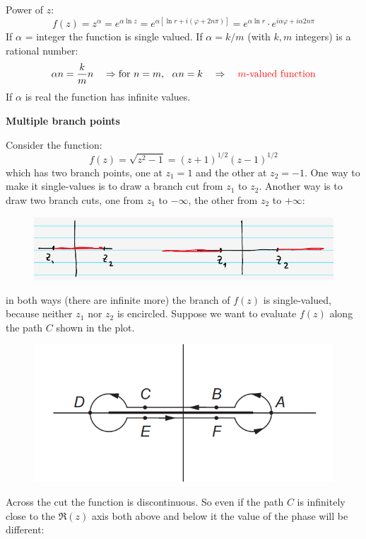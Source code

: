 \documentclass{article}
\begin{document}
\noindent
Power of $z$:
\begin{equation}
    f(z) = z^{\alpha} = e^{\alpha \ln z} = e^{\alpha [\ln r + i (\varphi + 2n\pi)]} = e^{\alpha \ln r} \cdot e^{i \alpha \varphi + i \alpha 2n\pi}
\end{equation}
If $\alpha$ = integer the function is single valued. If $\alpha = k/m$ (with $k,m$ integers) is a rational number:
\begin{equation}
    \alpha n = \frac{k}{m} n \quad \Rightarrow \text{for }n=m, \ \ \alpha n = k \quad \Rightarrow \quad \color{red} \text{$m$-valued function} \color{black}
\end{equation}
If $\alpha$ is real the function has infinite values.

\vspace{3mm} \noindent
\textbf{Multiple branch points}

\noindent
Consider the function:
\begin{equation}
    f(z) = \sqrt{z^2 - 1} = (z+1)^{1/2} (z-1)^{1/2}
\end{equation}
which has two branch points, one at $z_1 =1$ and the other at $z_2 =-1$. One way to make it single-values is to draw a branch cut from $z_1$ to $z_2$. Another way is to draw two branch cuts, one from $z_1$ to $-\infty$, the other from $z_2$ to $+\infty$:
\begin{figure}[h]
    \centering
    \includegraphics[width=0.75\linewidth]{fig23.png}
\end{figure}

\noindent
in both ways (there are infinite more) the branch of $f(z)$ is single-valued, because neither $z_1$ nor $z_2$ is encircled. Suppose we want to evaluate $f(z)$ along the path $C$ shown in the plot.

\begin{figure}[h]
    \centering
    \includegraphics[width=0.35\linewidth]{fig24.png}
\end{figure}

\noindent
Across the cut the function is discontinuous. So even if the path $C$ is infinitely close to the $\Re (z)$ axis both above and below it the value of the phase will be different:
\end{document}
